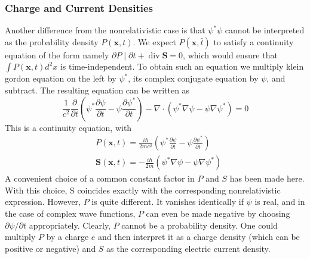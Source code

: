  \subsubsection{Charge and Current Densities}
 Another difference from the nonrelativistic case is that $\psi^{*} \psi$ cannot be interpreted as the probability density $P(\mathbf{x}, t) .$ We expect $P(\mathbf{x}, \bar{t})$ to satisfy a continuity equation of the form  namely $\partial P \mid \partial t+\operatorname{div} \mathbf{S}=0$, which would ensure that $\int P(\mathbf{x}, t) d^{2} x$ is time-independent. To obtain such an equation we multiply klein gordon equation on the left by $\psi^{*}$, its complex conjugate equation by $\psi$, and subtract.
 The resulting equation can be written as
 $$
 \frac{1}{c^{2}} \frac{\partial}{\partial t}\left(\psi^{*} \frac{\partial \psi}{\partial t}-\psi \frac{\partial \psi^{*}}{\partial t}\right)-\nabla \cdot\left(\psi^{*} \nabla \psi-\psi \nabla \psi^{*}\right)=0
 $$
 This is a continuity cquation, with
 $$
 \begin{aligned}
 &P(\mathbf{x}, t)=\frac{i \hbar}{2 m c^{2}}\left(\psi^{*} \frac{\partial \psi}{\partial t}-\psi \frac{\partial \psi^{*}}{\partial t}\right) \\
 &{\mathbf{S}(\mathbf{x}, t)=-\frac{i \hbar}{2 m}\left(\psi^{*} \nabla \psi-\psi \nabla \psi^{*}\right)}
 \end{aligned}
 $$
 A convenient choice of a common constant factor in $P$ and $S$ has been made here. With this choice, S coincides exactly with the corresponding nonrelativistic expression. However, $P$ is quite different. It vanishes identically if $\psi$ is real, and in the case of complex wave functions, $P$ can even be made negative by choosing $\partial \psi / \partial t$ appropriately. Clearly, $P$ cannot be a probability density. One could multiply $P$ by a charge $e$ and then interpret it as a charge density (which can be positive or negative) and $S$ as the corresponding electric current density.
